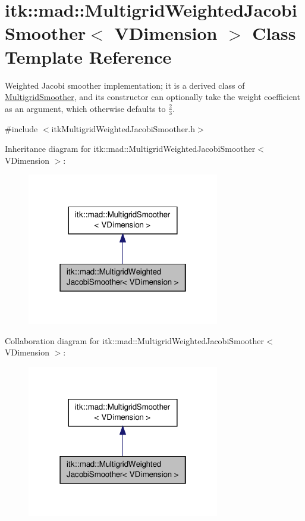 \hypertarget{classitk_1_1mad_1_1_multigrid_weighted_jacobi_smoother}{\section{itk\-:\-:mad\-:\-:Multigrid\-Weighted\-Jacobi\-Smoother$<$ V\-Dimension $>$ Class Template Reference}
\label{classitk_1_1mad_1_1_multigrid_weighted_jacobi_smoother}
}


Weighted Jacobi smoother implementation; it is a derived class of \hyperlink{classitk_1_1mad_1_1_multigrid_smoother}{Multigrid\-Smoother}, and its constructor can optionally take the weight coefficient as an argument, which otherwise defaults to $ \frac{2}{3} $.  




{\ttfamily \#include $<$itk\-Multigrid\-Weighted\-Jacobi\-Smoother.\-h$>$}



Inheritance diagram for itk\-:\-:mad\-:\-:Multigrid\-Weighted\-Jacobi\-Smoother$<$ V\-Dimension $>$\-:
\nopagebreak
\begin{figure}[H]
\begin{center}
\leavevmode
\includegraphics[width=238pt]{classitk_1_1mad_1_1_multigrid_weighted_jacobi_smoother__inherit__graph}
\end{center}
\end{figure}


Collaboration diagram for itk\-:\-:mad\-:\-:Multigrid\-Weighted\-Jacobi\-Smoother$<$ V\-Dimension $>$\-:
\nopagebreak
\begin{figure}[H]
\begin{center}
\leavevmode
\includegraphics[width=238pt]{classitk_1_1mad_1_1_multigrid_weighted_jacobi_smoother__coll__graph}
\end{center}
\end{figure}
